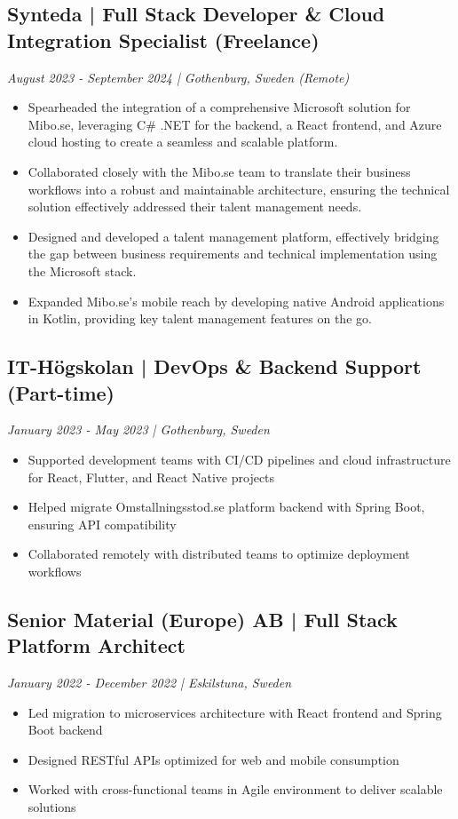 \documentclass[11pt,a4paper]{article}
\begin{document}
\subsection*{Synteda | Full Stack Developer \& Cloud Integration Specialist (Freelance)}
\textit{August 2023 - September 2024 | Gothenburg, Sweden (Remote)}
\begin{itemize}[noitemsep]
\item Spearheaded the integration of a comprehensive Microsoft solution for Mibo.se, leveraging C# .NET for the backend, a React frontend, and Azure cloud hosting to create a seamless and scalable platform.
\item Collaborated closely with the Mibo.se team to translate their business workflows into a robust and maintainable architecture, ensuring the technical solution effectively addressed their talent management needs.
\item Designed and developed a talent management platform, effectively bridging the gap between business requirements and technical implementation using the Microsoft stack.
\item Expanded Mibo.se's mobile reach by developing native Android applications in Kotlin, providing key talent management features on the go.
\end{itemize}

\subsection*{IT-Högskolan | DevOps \& Backend Support (Part-time)}
\textit{January 2023 - May 2023 | Gothenburg, Sweden}
\begin{itemize}[noitemsep]
\item Supported development teams with CI/CD pipelines and cloud infrastructure for React, Flutter, and React Native projects
\item Helped migrate Omstallningsstod.se platform backend with Spring Boot, ensuring API compatibility
\item Collaborated remotely with distributed teams to optimize deployment workflows
\end{itemize}

\subsection*{Senior Material (Europe) AB | Full Stack Platform Architect}
\textit{January 2022 - December 2022 | Eskilstuna, Sweden}
\begin{itemize}[noitemsep]
\item Led migration to microservices architecture with React frontend and Spring Boot backend
\item Designed RESTful APIs optimized for web and mobile consumption
\item Worked with cross-functional teams in Agile environment to deliver scalable solutions
\end{itemize}
\end{document}
